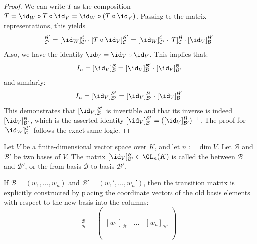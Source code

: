 \begin{proof}
We can write $T$ as the composition $T = \id_W \circ T \circ \id_V = \id_W \circ (T \circ \id_V)$. Passing to the matrix representations, this yields:
\begin{equation*}
    [T]_{\mathcal{C}'}^{\mathcal{B}'} = [\id_W]_{\mathcal{C}'}^{\mathcal{C}} \cdot [T \circ \id_V]_{\mathcal{C}}^{\mathcal{B}'} = [\id_W]_{\mathcal{C}'}^{\mathcal{C}} \cdot [T]_{\mathcal{C}}^{\mathcal{B}} \cdot [\id_V]_{\mathcal{B}}^{\mathcal{B}'}
\end{equation*}
Also, we have the identity $\id_V = \id_V \circ \id_V$. This implies that:
\begin{equation*}
    I_n = [\id_V]_{\mathcal{B}}^{\mathcal{B}} = [\id_V]_{\mathcal{B}}^{\mathcal{B}'} \cdot [\id_V]_{\mathcal{B}'}^{\mathcal{B}}
\end{equation*}
and similarly:
\begin{equation*}
    I_n = [\id_V]_{\mathcal{B}'}^{\mathcal{B}'} = [\id_V]_{\mathcal{B}'}^{\mathcal{B}} \cdot [\id_V]_{\mathcal{B}}^{\mathcal{B}'}
\end{equation*}
This demonstrates that $[\id_V]_{\mathcal{B}}^{\mathcal{B}'}$ is invertible and that its inverse is indeed $[\id_V]_{\mathcal{B}'}^{\mathcal{B}}$, which is the asserted identity $[\id_V]_{\mathcal{B}}^{\mathcal{B}'} = ([\id_V]_{\mathcal{B}'}^{\mathcal{B}})^{-1}$. The proof for $[\id_W]_{\mathcal{C}}^{\mathcal{C}'}$ follows the exact same logic.
\end{proof}

\begin{definition}
\label{def:change_of_basis_matrix}
Let $V$ be a finite-di\-men\-sional vector space over $K$, and let $n := \dim V$. Let $\mathcal{B}$ and $\mathcal{B}'$ be two bases of $V$. The matrix $[\id_V]_{\mathcal{B}'}^{\mathcal{B}} \in \GL_n(K)$ is called the  between $\mathcal{B}$ and $\mathcal{B}'$, or the  from basis $\mathcal{B}$ to basis $\mathcal{B}'$.
\end{definition}

\begin{remark}
If $\mathcal{B} = (w_1, \dots, w_n)$ and $\mathcal{B}' = (w_1', \dots, w_n')$, then the transition matrix is explicitly constructed by placing the coordinate vectors of the old basis elements with respect to the new basis into the columns:
\begin{equation*}
    [\id_V]_{\mathcal{B}'}^{\mathcal{B}} = \begin{pmatrix} | & & | \\ [w_1]_{\mathcal{B}'} & \dots & [w_n]_{\mathcal{B}'} \\ | & & | \end{pmatrix}
\end{equation*}
\end{remark}

